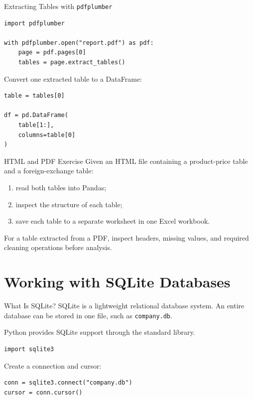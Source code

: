 \documentclass[aspectratio=169,11pt]{beamer}
\newcommand{\code}[1]{\texttt{#1}}
\newcommand{\smallgap}{\vspace{0.4em}}
\begin{document}
\begin{frame}[fragile]{Extracting Tables with \code{pdfplumber}}
\begin{lstlisting}[style=pythonstyle]
import pdfplumber

with pdfplumber.open("report.pdf") as pdf:
    page = pdf.pages[0]
    tables = page.extract_tables()
\end{lstlisting}

Convert one extracted table to a DataFrame:
\begin{lstlisting}[style=pythonstyle]
table = tables[0]

df = pd.DataFrame(
    table[1:],
    columns=table[0]
)
\end{lstlisting}
\end{frame}

\begin{frame}{HTML and PDF Exercise}
Given an HTML file containing a product-price table and a foreign-exchange table:
\begin{enumerate}
  \item read both tables into Pandas;
  \item inspect the structure of each table;
  \item save each table to a separate worksheet in one Excel workbook.
\end{enumerate}

\smallgap
For a table extracted from a PDF, inspect headers, missing values, and required cleaning operations before analysis.
\end{frame}

\section{Working with SQLite Databases}

\begin{frame}[fragile]{What Is SQLite?}
SQLite is a lightweight relational database system. An entire database can be stored in one file, such as \code{company.db}.

Python provides SQLite support through the standard library.
\begin{lstlisting}[style=pythonstyle]
import sqlite3
\end{lstlisting}

Create a connection and cursor:
\begin{lstlisting}[style=pythonstyle]
conn = sqlite3.connect("company.db")
cursor = conn.cursor()
\end{lstlisting}
\end{frame}
\end{document}
